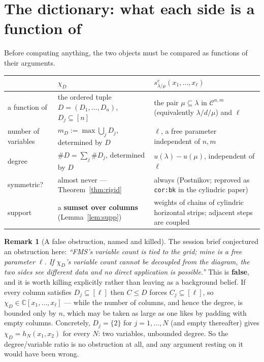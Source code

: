 \documentclass[11pt]{article}
\theoremstyle{definition}
\newtheorem{rem}[thm]{Remark}
\newcommand{\cyl}{\mathcal{C}}
\begin{document}
\section{The dictionary: what each side is a function of}\label{sec:dict}

Before computing anything, the two objects must be compared as functions of their arguments.

\begin{center}
\begin{tabular}{p{}p{}p{}}
\toprule
& $\chi_D$ & $s^c_{\lambda/\mu}(x_1,\dots,x_\ell)$\\
\midrule
a function of &
the ordered tuple $D=(D_1,\dots,D_n)$, $D_j\subseteq[n]$ &
the pair $\mu\subseteq\lambda$ in $\cyl^{n,m}$ (equivalently $\lambda/d/\mu$) and $\ell$\\
\addlinespace
number of variables &
$m_D:=\max\bigcup_j D_j$, determined by $D$ &
$\ell$, a free parameter independent of $n,m$\\
\addlinespace
degree &
$\#D=\sum_j\#D_j$, determined by $D$ &
$u(\lambda)-u(\mu)$, independent of $\ell$\\
\addlinespace
symmetric? &
almost never --- Theorem~\ref{thm:rigid} &
always (Postnikov; reproved as \texttt{cor:bk} in the cylindric paper)\\
\addlinespace
support &
a \textbf{sumset over columns} (Lemma~\ref{lem:supp}) &
weights of chains of cylindric horizontal strips; adjacent steps are coupled\\
\bottomrule
\end{tabular}
\end{center}

\begin{rem}[A false obstruction, named and killed]\label{rem:falseobs}
The session brief conjectured an obstruction here: \emph{``FMS's variable count is tied to the
grid; mine is a free parameter $\ell$. If $\chi_D$'s variable count cannot be decoupled from the
diagram, the two sides see different data and no direct application is possible.''} This is
\textbf{false}, and it is worth killing explicitly rather than leaving as a background belief.
If every column satisfies $D_j\subseteq[\ell]$ then $C\le D$ forces $C_j\subseteq[\ell]$, so
$\chi_D\in\mathbb{C}[x_1,\dots,x_\ell]$ --- while the number of columns, and hence the degree,
is bounded only by $n$, which may be taken as large as one likes by padding with empty columns.
Concretely, $D_j=\{2\}$ for $j=1,\dots,N$ (and empty thereafter) gives
$\chi_D=h_N(x_1,x_2)$ for every $N$: two variables, unbounded degree. So the degree/variable
ratio is no obstruction at all, and any argument resting on it would have been wrong.
\end{rem}
\end{document}
